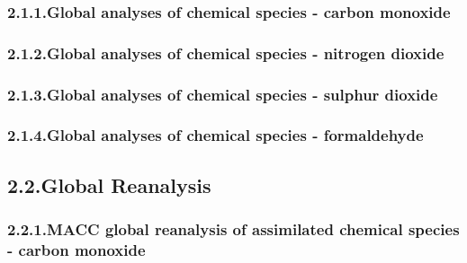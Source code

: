 \documentclass[9pt]{report}
\begin{document}
\subsubsection{2.1.1.\hspace*{0.5em}Global analyses of chemical species - carbon monoxide}\label{sec-global-analyses-of-chemical-species---carbon-monoxide}%

\subsubsection{2.1.2.\hspace*{0.5em}Global analyses of chemical species - nitrogen dioxide}\label{sec-global-analyses-of-chemical-species---nitrogen-dioxide}%

\subsubsection{2.1.3.\hspace*{0.5em}Global analyses of chemical species - sulphur dioxide}\label{sec-global-analyses-of-chemical-species---sulphur-dioxide}%

\subsubsection{2.1.4.\hspace*{0.5em}Global analyses of chemical species - formaldehyde}\label{sec-global-analyses-of-chemical-species---formaldehyde}%

\subsection{2.2.\hspace*{0.5em}Global Reanalysis}\label{sec-global-reanalysis}%

\subsubsection{2.2.1.\hspace*{0.5em}MACC global reanalysis of assimilated chemical species - carbon monoxide}\label{sec-macc-global-reanalysis-of-assimilated-chemical-species---carbon-monoxide}%
\end{document}
